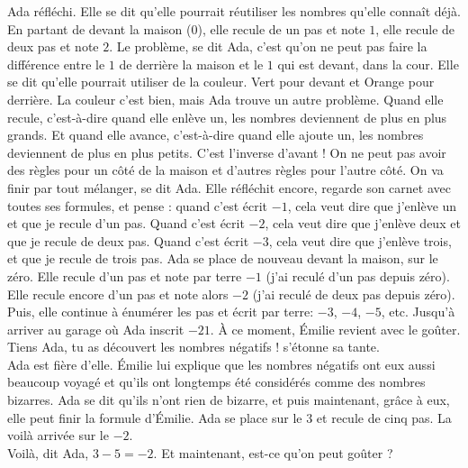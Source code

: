 Ada réfléchi. 
Elle se dit qu’elle pourrait réutiliser les nombres qu’elle connaît déjà. En partant de devant la maison ($0$), elle recule de un pas et note $1$, elle recule de deux pas et note $2$. 
Le problème, se dit Ada, c’est qu’on ne peut pas faire la différence entre le $1$ de derrière la maison et le $1$ qui est devant, dans la cour. 
Elle se dit qu’elle pourrait utiliser de la couleur. 
Vert pour devant et Orange pour derrière. 
La couleur c’est bien, mais Ada trouve un autre problème. 
Quand elle recule, c'est-à-dire quand elle enlève un, les nombres deviennent de plus en plus grands. Et quand elle avance, c’est-à-dire quand elle ajoute un, les nombres deviennent de plus en plus petits.
C’est l’inverse d’avant ! On ne peut pas avoir des règles pour un côté de la maison et d’autres règles pour l’autre côté. 
On va finir par tout mélanger, se dit Ada. 
Elle réfléchit encore, regarde son carnet avec toutes ses formules, et pense : quand c’est écrit $-1$, cela veut dire que j’enlève un et que je recule d’un pas. Quand c’est écrit $-2$, cela veut dire que j’enlève deux et que je recule de deux pas. Quand c’est écrit $-3$, cela veut dire que j’enlève trois, et que je recule de trois pas. 
Ada se place de nouveau devant la maison, sur le zéro. Elle recule d’un pas et note par terre $-1$ (j’ai reculé d’un pas depuis zéro). Elle recule encore d’un pas et note alors $-2$ (j’ai reculé de deux pas depuis zéro). Puis, elle continue à énumérer les pas et écrit par terre: $-3$, $-4$, $-5$, etc. 
Jusqu'à arriver au garage où Ada inscrit $-21$. 
À ce moment, Émilie revient avec le goûter.\\
\guillemotleft Tiens Ada, tu as découvert les nombres négatifs ! s’étonne sa tante. \guillemotright\\
Ada est fière d’elle. Émilie lui explique que les nombres négatifs ont eux aussi beaucoup voyagé et qu’ils ont longtemps été considérés comme des nombres bizarres. Ada se dit qu’ils n’ont rien de bizarre, et puis maintenant, grâce à eux, elle peut finir la formule d’Émilie. Ada se place sur le $3$ et recule de cinq pas. La voilà arrivée sur le $-2$.\\
\guillemotleft Voilà, dit Ada, $3 - 5 = -2$. Et maintenant, est-ce qu’on peut goûter ? \guillemotright

%    
